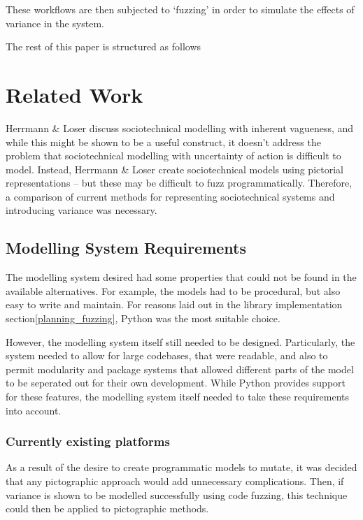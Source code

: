 \documentclass[11pt, twocolumn]{article}
\begin{document}
  These workflows are then subjected to
`fuzzing' in order to simulate the effects of variance in the system.

The rest of this paper is structured as follows


\section{Related Work}


\label{related_head}
Herrmann \& Loser\cite{Herrmann1999} discuss sociotechnical modelling with inherent vagueness, and while this might be shown to be a useful construct, it doesn't address the problem that sociotechnical modelling with uncertainty of action is difficult to model. Instead, Herrmann \& Loser create sociotechnical models using pictorial representations -- but these may be difficult to fuzz programmatically. Therefore, a comparison of current methods for representing sociotechnical systems and introducing variance was necessary. \par

\subsection{Modelling System Requirements}\label{planning_modelling_requirements}
The modelling system desired had some properties that could not be found in the available alternatives. For example, the models had to be procedural, but also easy to write and maintain. For reasons laid out in the library implementation section\cref{planning_fuzzing}, Python was the most suitable choice. \par

However, the modelling system itself still needed to be designed. Particularly, the system needed to allow for large codebases, that were readable, and also to permit modularity and package systems that allowed different parts of the model to be seperated out for their own development. While Python provides support for these features, the modelling system itself needed to take these requirements into account.  \par

\subsubsection{Currently existing platforms}
As a result of the desire to create programmatic models to mutate, it was decided that any pictographic approach would add unnecessary complications. Then, if variance is shown to be modelled successfully using code fuzzing, this technique could then be applied to pictographic methods. \par
\end{document}
